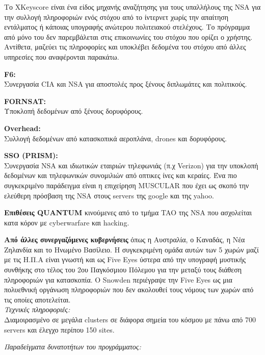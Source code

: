 \documentclass[a4paper, 11pt]{article}
\newcommand{\lt}{\latintext}
\begin{document}
\begin{itemize}
	Το {\lt XKeyscore} είναι ένα είδος μηχανής αναζήτησης για τους υπαλλήλους της {\lt NSA} για την συλλογή πληροφοριών ενός στόχου από το ίντερνετ χωρίς την απαίτηση εντάλματος ή κάποιας υπογραφής ανώτερου πολιτειακού στελέχους. Το πρόγραμμα από μόνο του δεν παρεμβάλεται στις επικοινωνίες του στόχου που ορίζει ο χρήστης. Αντίθετα, μαζεύει τις πληροφορίες και υποκλέβει δεδομένα του στόχου από άλλες υπηρεσίες που αναφέρονται παρακάτω.


{\textbf {\lt F6:}} \\
Συνεργασία {\lt CIA} και {\lt NSA} για αποστολές προς ξένους διπλωμάτες και πολιτικούς.

{\textbf {\lt FORNSAT:}} \\
Υποκλοπή δεδομένων από ξένους δορυφόρους.

{\textbf {\lt Overhead:}} \\
Συλλογή δεδομένων από κατασκοπικά αεροπλάνα, {\lt drones} και δορυφόρους.

{\textbf {\lt  SSO (PRISM):}} \\
Συνεργασία {\lt NSA} και ιδιωτικών εταιριών τηλεφωνιάς (π.χ {\lt Verizon}) για την υποκλοπή δεδομένων και τηλεφωνικών συνομιλιών από οπτικες ίνες και κεραίες. Ένα πιο συγκεκριμένο παράδειγμα είναι η επιχείρηση {\lt MUSCULAR} που έχει ως σκοπό την ελεύθερη πρόσβαση της {\lt NSA} στους {\lt servers} της {\lt google} και της {\lt yahoo}.

{\textbf {Επιθέσεις {\lt QUANTUM}}} κινούμενες από το τμήμα {\lt TAO} της {\lt NSA} που ασχολείται κατα κόρον με {\lt cyberwarfare} και {\lt hacking}. 

{\textbf {Από άλλες συνεργαζόμενες κυβερνήσεις}} όπως η Αυστραλία, ο Καναδάς, η Νέα Ζηλανδία και το Ηνωμένο Βασίλειο. Η συγκεκριμένη ομάδα αυτών των 5 χωρών μαζί με τις Η.Π.Α είναι γνωστή και ως {\lt Five Eyes} ύστερα από την υπογραφή μυστικής συνθήκης στο τέλος του 2ου Παγκόσμιου Πόλεμου για την μεταξύ τους διάθεση πληροφοριών για κατασκοπία. Ο {\lt Snowden} περιέγραψε την {\lt Five Eyes} ως μια πολυεθνική οργάνωση πληροφοριών που δεν ακολουθεί τους νόμους των χωρών από τις οποίες αποτελείται.
\\

{\textit {Τεχνικές πληροφοριές:}} \\
Διαμοιρασμένο σε μεγάλα {\lt clusters} σε διάφορα σημεία του κόσμου με πάνω από 700 {\lt servers} και έλεγχο περίπου 150 {\lt sites}.

{\textit {Παραδείγματα δυνατοτήτων του προγράμματος:}} 
\begin{itemize}


\end{itemize}
\end{itemize}
\end{document}
